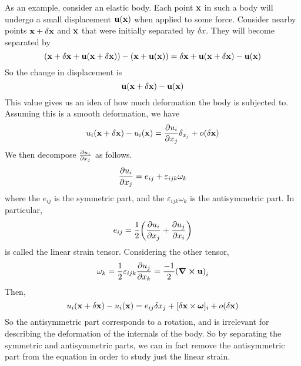 \noindent As an example, consider an elastic body.
Each point \(\vb x\) in such a body will undergo a small displacement \(\vb u(\vb x)\) when applied to some force.
Consider nearby points \(\vb x + \delta\vb x\) and \(\vb x\) that were initially separated by \(\delta x\).
They will become separated by
\[
	(\vb x + \delta \vb x + \vb u(\vb x + \delta\vb x)) - (\vb x + \vb u(\vb x)) = \delta \vb x + \vb u(\vb x + \delta\vb x) - \vb u(\vb x)
\]
So the change in displacement is
\[
	\vb u(\vb x + \delta\vb x) - \vb u(\vb x)
\]
This value gives us an idea of how much deformation the body is subjected to.
Assuming this is a smooth deformation, we have
\[
	u_i(\vb x + \delta\vb x) - u_i(\vb x) = \pdv{u_i}{x_j}\delta_{x_j} + o(\delta \vb x)
\]
We then decompose \(\pdv{u_i}{x_j}\) as follows.
\[
	\pdv{u_i}{x_j} = e_{ij} + \varepsilon_{ijk}\omega_k
\]
where the \(e_{ij}\) is the symmetric part, and the \(\varepsilon_{ijk}\omega_k\) is the antisymmetric part.
In particular,
\[
	e_{ij} = \frac{1}{2}\qty(\pdv{u_i}{x_j} + \pdv{u_j}{x_i})
\]
is called the linear strain tensor.
Considering the other tensor,
\[
	\omega_k = \frac{1}{2}\varepsilon_{ijk}\pdv{u_j}{x_k} = \frac{-1}{2}\qty(\curl{\vb u})_i
\]
Then,
\[
	u_i(\vb x + \delta \vb x) - u_i(\vb x) = e_{ij} \delta x_j + [\delta \vb x \times \bm \omega]_i + o(\delta \vb x)
\]
So the antisymmetric part corresponds to a rotation, and is irrelevant for describing the deformation of the internals of the body.
So by separating the symmetric and antisymmetric parts, we can in fact remove the antisymmetric part from the equation in order to study just the linear strain.

